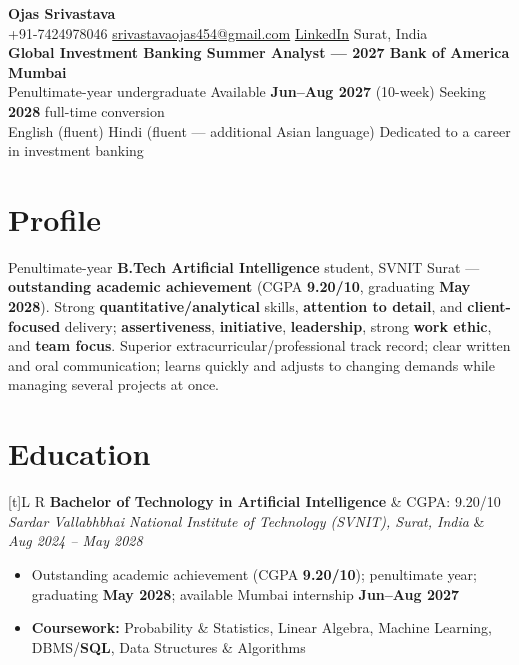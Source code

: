 \documentclass[a4paper,10pt]{article}
\newcommand{\resumeSubheading}[4]{%
  \vspace{0.25mm}
  \noindent
  \begin{tabularx}{\textwidth}[t]{L R}
    \textbf{#1} & #4 \\
    \textit{#3} & \textit{#2} \\
  \end{tabularx}
  \vspace{-0.25mm}%
}
\begin{document}
\selectfont

\begin{center}
  {\LARGE \textbf{Ojas Srivastava}} \\[0.55mm]
  \small
  +91-7424978046 \textbar{}
  \href{mailto:srivastavaojas454@gmail.com}{srivastavaojas454@gmail.com} \textbar{}
  \href{https://linkedin.com/in/ojas-srivastava05}{LinkedIn} \textbar{}
  Surat, India \\[0.15mm]
  \textbf{Global Investment Banking Summer Analyst --- 2027 \textbar{} Bank of America \textbar{} Mumbai} \\[0.1mm]
  Penultimate-year undergraduate \textbar{} Available \textbf{Jun--Aug 2027} (10-week) \textbar{} Seeking \textbf{2028} full-time conversion \\[0.1mm]
  English (fluent) \textbar{} Hindi (fluent --- additional Asian language) \textbar{} Dedicated to a career in investment banking
\end{center}

\vspace{-0.45mm}

\section{Profile}
\small
Penultimate-year \textbf{B.Tech Artificial Intelligence} student, SVNIT Surat --- \textbf{outstanding academic achievement} (CGPA \textbf{9.20/10}, graduating \textbf{May 2028}). Strong \textbf{quantitative/analytical} skills, \textbf{attention to detail}, and \textbf{client-focused} delivery; \textbf{assertiveness}, \textbf{initiative}, \textbf{leadership}, strong \textbf{work ethic}, and \textbf{team focus}. Superior extracurricular/professional track record; clear written and oral communication; learns quickly and adjusts to changing demands while managing several projects at once.

\section{Education}
\small
\resumeSubheading
  {Bachelor of Technology in Artificial Intelligence}{Aug 2024 -- May 2028}
  {Sardar Vallabhbhai National Institute of Technology (SVNIT), Surat, India}{CGPA: 9.20/10}
\begin{itemize}
  \item Outstanding academic achievement (CGPA \textbf{9.20/10}); penultimate year; graduating \textbf{May 2028}; available Mumbai internship \textbf{Jun--Aug 2027}
  \item \textbf{Coursework:} Probability \& Statistics, Linear Algebra, Machine Learning, DBMS/\textbf{SQL}, Data Structures \& Algorithms
\end{itemize}
\end{document}
